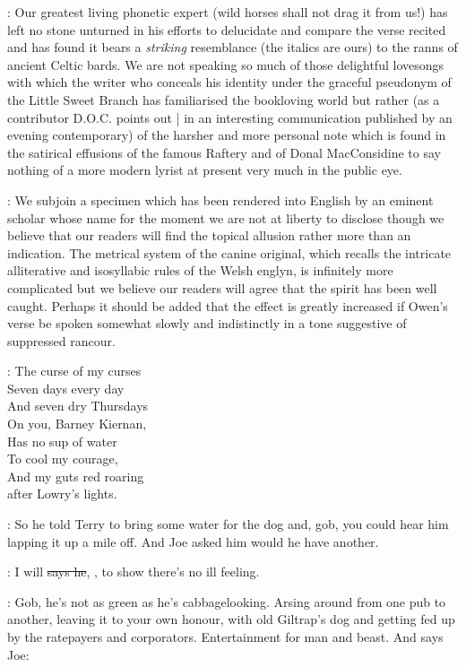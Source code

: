 :
Our greatest living
phonetic expert
(wild horses shall not drag it from us!) has left no stone
unturned in his efforts to delucidate and compare the verse recited and has
found it bears a \emph{striking} resemblance (the italics are ours) to the ranns
of ancient Celtic bards.
We are not speaking so much of those delightful
lovesongs with which the writer who conceals his identity under the
graceful pseudonym of the Little Sweet Branch has familiarised the
bookloving world but rather
(as a contributor D.O.C. points out |
in an interesting communication published by an evening contemporary)
of the harsher and more personal note which is found in the satirical effusions
of the famous Raftery and of Donal MacConsidine to say nothing of a more
modern lyrist at present very much in the public eye.%

:
We subjoin a
specimen which has been rendered into English by an eminent scholar
whose name for the moment we are not at liberty to disclose though
we believe that our readers will find the topical allusion rather
more than an indication.
The metrical system of the canine original,
which recalls the intricate alliterative and isosyllabic rules of
the Welsh englyn,
is infinitely more complicated but we believe our
readers will agree that the spirit has been well caught.
Perhaps
it should be added that the effect is greatly increased if Owen's
verse be spoken somewhat slowly and indistinctly in a tone suggestive
of suppressed rancour.

\garryowen:
    The curse
       of my curses\\
    Seven days every day\\
    And seven dry Thursdays\\
    On you,
Barney Kiernan,\\
    Has no sup of water\\
    To cool my courage,\\
    And my guts red roaring\\
    after Lowry's lights.

\Nq:
So he told Terry to bring some water for the dog and,
gob,
you could
hear him lapping it up a mile off.
And Joe asked him would he have
another.%

\citizen:
I will
\sout{says he},
,
to show there's no ill feeling.

\Nq:
Gob,
he's not as green as he's cabbagelooking.
Arsing around from
one pub to another,
leaving it to your own honour,
with old Giltrap's dog
and getting fed up by the ratepayers and corporators.
Entertainment for
man and beast.
And says Joe:

